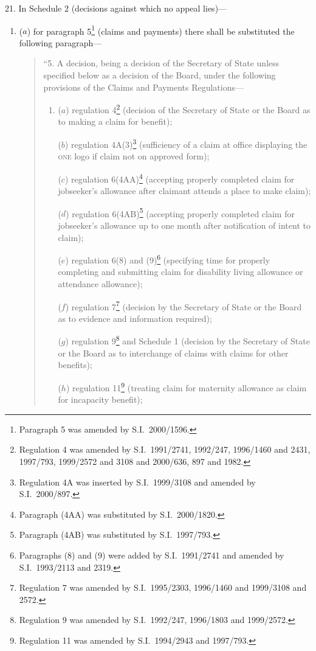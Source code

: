 \documentclass[12pt,a4paper]{article}
\begin{document}
21.  In Schedule 2 (decisions against which no appeal lies)—
\begin{enumerate}\item[]
($a$) for paragraph 5\footnote{Paragraph 5 was amended by S.I.\ 2000/1596.} (claims and payments) there shall be substituted the following paragraph—
\begin{quotation}
“5.  A decision, being a decision of the Secretary of State unless specified below as a decision of the Board, under the following provisions of the Claims and Payments Regulations—
\begin{enumerate}\item[]
($a$) regulation 4\footnote{Regulation 4 was amended by S.I.\ 1991/2741, 1992/247, 1996/1460 and 2431, 1997/793, 1999/2572 and 3108 and 2000/636, 897 and 1982.} (decision of the Secretary of State or the Board as to making a claim for benefit);

($b$) regulation 4A(3)\footnote{Regulation 4A was inserted by S.I.\ 1999/3108 and amended by S.I.\ 2000/897.} (sufficiency of a claim at office displaying the \textsc{\lowercase{ONE}} logo if claim not on approved form);

($c$) regulation 6(4AA)\footnote{Paragraph (4AA) was substituted by S.I.\ 2000/1820.} (accepting properly completed claim for jobseeker’s allowance after claimant attends a place to make claim);

($d$) regulation 6(4AB)\footnote{Paragraph (4AB) was substituted by S.I.\ 1997/793.} (accepting properly completed claim for jobseeker’s allowance up to one month after notification of intent to claim);

($e$) regulation 6(8) and (9)\footnote{Paragraphs (8) and (9) were added by S.I.\ 1991/2741 and amended by S.I.\ 1993/2113 and 2319.} (specifying time for properly completing and submitting claim for disability living allowance or attendance allowance);

($f$) regulation 7\footnote{Regulation 7 was amended by S.I.\ 1995/2303, 1996/1460 and 1999/3108 and 2572.} (decision by the Secretary of State or the Board as to evidence and information required);

($g$) regulation 9\footnote{Regulation 9 was amended by S.I.\ 1992/247, 1996/1803 and 1999/2572.} and Schedule 1 (decision by the Secretary of State or the Board as to interchange of claims with claims for other benefits);

($h$) regulation 11\footnote{Regulation 11 was amended by S.I.\ 1994/2943 and 1997/793.} (treating claim for maternity allowance as claim for incapacity benefit);


\end{enumerate}
\end{quotation}
\end{enumerate}
\end{document}
